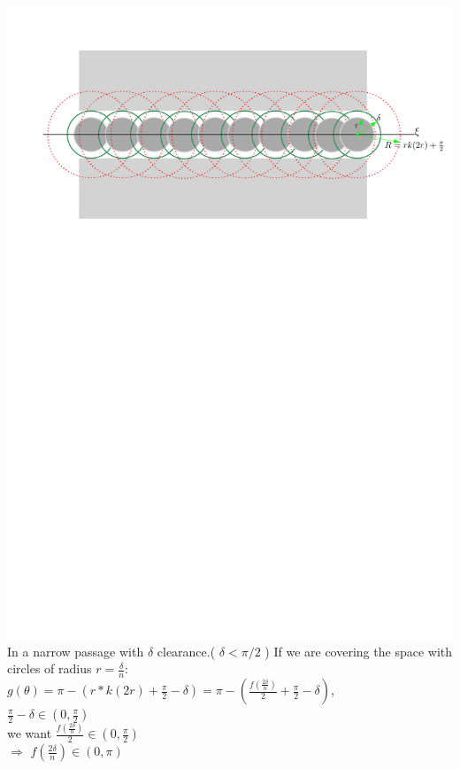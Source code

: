 \documentclass[12pt]{article}
\begin{document}
  \hspace*{-2cm}\includegraphics[scale=0.84]{CirclesCoveredPath}\\

  In a narrow passage with $\delta$ clearance.( $\delta<\pi / 2$ ) If we are covering the space with circles of radius $r = \frac{\delta}{n}$:\\
  
  $g(\theta) = \pi - (r*k(2r) + \frac{\pi}{2} - \delta) = \pi - ( \frac{f(\frac{2\delta}{n})}{2} + \frac{\pi}{2} - \delta )$,\\
  
  $\frac{\pi}{2} - \delta \in (0, \frac{\pi}{2})$\\
  
  we want $\frac{f(\frac{2\delta}{n})}{2} \in (0, \frac{\pi}{2})$\\
  
  $\Longrightarrow$ $f(\frac{2\delta}{n}) \in (0, \pi)$\\
  
\end{document}
